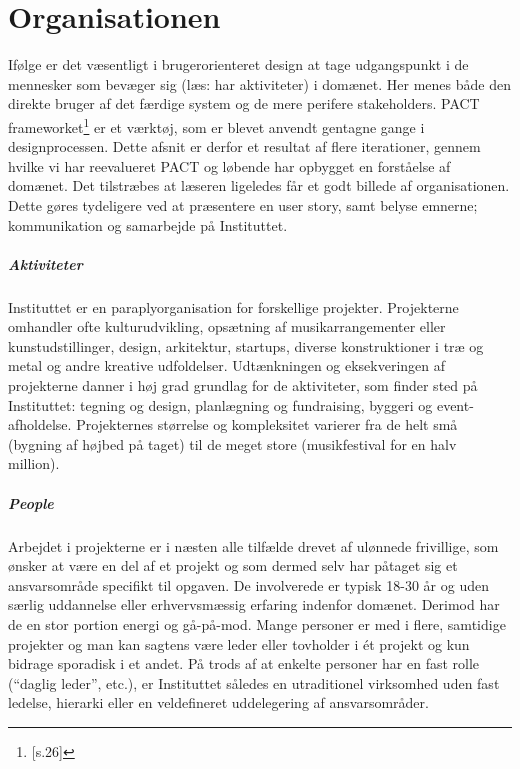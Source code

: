 \chapter{Organisationen}
Ifølge \citep{Benyon} er det væsentligt i brugerorienteret design at tage udgangspunkt i de mennesker som bevæger sig (læs: har aktiviteter) i domænet. Her menes både den direkte bruger af det færdige system og de mere perifere stakeholders. PACT frameworket\footnote{\citep{Benyon}[s.26]} er et værktøj, som er blevet anvendt gentagne gange i designprocessen. 
Dette afsnit er derfor et resultat af flere iterationer, gennem hvilke vi har reevalueret PACT og løbende har opbygget en forståelse af domænet. Det tilstræbes at læseren ligeledes får et godt billede af organisationen. Dette gøres tydeligere ved at præsentere en user story, samt belyse emnerne; kommunikation og samarbejde på Instituttet.     

\paragraph{Aktiviteter}
Instituttet er en paraplyorganisation for forskellige projekter. Projekterne omhandler ofte kulturudvikling, opsætning af musikarrangementer eller kunstudstillinger, design, arkitektur, startups, diverse konstruktioner i træ og metal og andre kreative udfoldelser. Udtænkningen og eksekveringen af projekterne danner i høj grad grundlag for de aktiviteter, som finder sted på Instituttet: tegning og design, planlægning og fundraising, byggeri og event-afholdelse. Projekternes størrelse og kompleksitet varierer fra de helt små (bygning af højbed på taget) til de meget store (musikfestival for en halv million). 

\paragraph{People}
Arbejdet i projekterne er i næsten alle tilfælde drevet af ulønnede frivillige, som ønsker at være en del af et projekt og som dermed selv har påtaget sig et ansvarsområde specifikt til opgaven. De involverede er typisk 18-30 år og uden særlig uddannelse eller erhvervsmæssig erfaring indenfor domænet. Derimod har de en stor portion energi og gå-på-mod. Mange personer er med i flere, samtidige projekter og man kan sagtens være leder eller tovholder i ét projekt og kun bidrage sporadisk i et andet. På trods af at enkelte personer har en fast rolle (“daglig leder”, etc.), er Instituttet således en utraditionel virksomhed uden fast ledelse, hierarki eller en veldefineret uddelegering af ansvarsområder.

